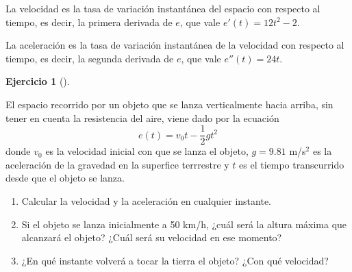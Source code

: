 \documentclass[
  spanish,
  a4paper,
]{scrreport}
\providecommand{\tightlist}{%
  \setlength{\itemsep}{0pt}\setlength{\parskip}{0pt}}
\theoremstyle{definition}
\newtheorem{exercise}{Ejercicio}[chapter]
\theoremstyle{remark}
\begin{document}
\begin{tcolorbox}[enhanced jigsaw, arc=.35mm, bottomrule=.15mm, bottomtitle=1mm, breakable, colback=white, colbacktitle=quarto-callout-tip-color!10!white, colframe=quarto-callout-tip-color-frame, coltitle=black, left=2mm, leftrule=.75mm, opacityback=0, opacitybacktitle=0.6, rightrule=.15mm, title=\textcolor{quarto-callout-tip-color}{\faLightbulb}\hspace{0.5em}{Solución}, titlerule=0mm, toprule=.15mm, toptitle=1mm]

La velocidad es la tasa de variación instantánea del espacio con
respecto al tiempo, es decir, la primera derivada de \(e\), que vale
\(e'(t)=12t^2-2\).

La aceleración es la tasa de variación instantánea de la velocidad con
respecto al tiempo, es decir, la segunda derivada de \(e\), que vale
\(e''(t) = 24t\).

\end{tcolorbox}

\begin{exercise}[]\protect\hypertarget{exr-cinematica-2}{}\label{exr-cinematica-2}

El espacio recorrido por un objeto que se lanza verticalmente hacia
arriba, sin tener en cuenta la resistencia del aire, viene dado por la
ecuación \[
e(t) =v_0t-\frac{1}{2}gt^2
\] donde \(v_0\) es la velocidad inicial con que se lanza el objeto,
\(g=9.81\) m/s\(^2\) es la aceleración de la gravedad en la superfice
terrrestre y \(t\) es el tiempo transcurrido desde que el objeto se
lanza.

\begin{enumerate}
\def\labelenumi{\alph{enumi}.}
\tightlist
\item
  Calcular la velocidad y la aceleración en cualquier instante.
\item
  Si el objeto se lanza inicialmente a 50 km/h, ¿cuál será la altura
  máxima que alcanzará el objeto? ¿Cuál será su velocidad en ese
  momento?
\item
  ¿En qué instante volverá a tocar la tierra el objeto? ¿Con qué
  velocidad?
\end{enumerate}

\end{exercise}
\end{document}
